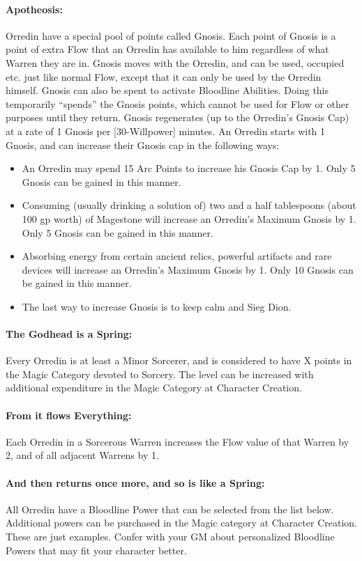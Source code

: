 \documentclass[oneside,11pt,english]{book}
\begin{document}
\paragraph{Apotheosis:} Orredin have a special pool of points called Gnosis. Each point of Gnosis is a point of extra 
Flow that an Orredin has available to him regardless of what Warren they are in. Gnosis moves with the 
Orredin, and can be used, occupied etc. just like normal Flow, except that it can only be used by the 
Orredin himself. 
Gnosis can also be spent to activate Bloodline Abilities. Doing this temporarily “spends” the Gnosis 
points, which cannot be used for Flow or other purposes until they return. Gnosis regenerates (up to the 
Orredin’s Gnosis Cap) at a rate of 1 Gnosis per [30-Willpower] minutes. 
An Orredin starts with 1 Gnosis, and can increase their Gnosis cap in the following ways:
\begin{itemize}
	\item An Orredin may spend 15 Arc Points to increase his Gnosis Cap by 1. Only 5 Gnosis can be gained in this manner. 
	\item Consuming (usually drinking a solution of) two and a half tablespoons (about 100 gp worth) of Magestone will increase an Orredin's Maximum Gnosis by 1. Only 5 Gnosis can be gained in this manner.
	\item Absorbing energy from certain ancient relics, powerful artifacts and rare devices will increase an Orredin's Maximum Gnosis by 1. Only 10 Gnosis can be gained in this manner. 
	\item The last way to increase Gnosis is to keep calm and Sieg Dion.
\end{itemize}
\paragraph{The Godhead is a Spring:} Every Orredin is at least a Minor Sorcerer, and is considered to have X points in the Magic Category devoted to Sorcery. The level can be increased with additional expenditure in the Magic Category at Character Creation. 
\paragraph{From it flows Everything:} Each Orredin in a Sorcerous Warren increases the Flow value of that Warren by 2, and of all adjacent Warrens by 1.
\paragraph{And then returns once more, and so is like a Spring:} All Orredin have a Bloodline Power that can be selected from the list below. Additional powers can be purchased in the Magic category at Character Creation. These are just examples. Confer with your GM about personalized Bloodline Powers that may fit your character better. 
\end{document}
